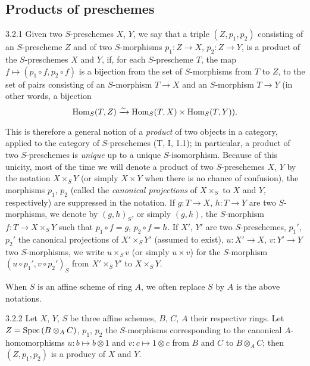 \subsection{Products of preschemes}
\label{1-schemes-3.2}

\begin{envs}[Definition]{3.2.1}
\label{defn-1.3.2.1}
Given two $S$-preschemes $X$, $Y$, we say that a triple $(Z,p_1,p_2)$ consisting of an
$S$-prescheme $Z$ and of two $S$-morphisms $p_1:Z\to X$, $p_2:Z\to Y$, is a product of the
$S$-preschemes $X$ and $Y$, if, for each $S$-prescheme $T$, the map
$f\mapsto(p_1\circ f,p_2\circ f)$ is a bijection from the set of $S$-morphisms from $T$ to
$Z$, to the set of pairs consisting of an $S$-morphism $T\to X$ and an $S$-morphism $T\to Y$
(in other words, a bijection
\[
  {\mathop{\mathrm{Hom}}\nolimits}_S(T,Z)\xrightarrow{\sim}{\mathop{\mathrm{Hom}}\nolimits}_S(T,X)\times{\mathop{\mathrm{Hom}}\nolimits}_S(T,Y)).
\]
\end{envs}

This is therefore a general notion of a \emph{product} of two objects in a category, applied
to the category of $S$-preschemes (T, I, 1.1); in particular, a product of two $S$-preschemes
is \emph{unique} up to a unique $S$-isomorphism. Because of this unicity, most of the time we
will denote a product of two $S$-preschemes $X$, $Y$ by the notation $X\times_S Y$ (or simply
$X\times Y$ when there is no chance of confusion), the morphisms $p_1$, $p_2$ (called the
\emph{canonical projections} of $X\times_S$ to $X$ and $Y$, respectively) are suppressed in
the notation. If $g:T\to X$, $h:T\to Y$ are two $S$-morphisms, we denote by $(g,h)_S$, or
simply $(g,h)$, the $S$-morphism $f:T\to X\times_S Y$ such that $p_1\circ f=g$,
$p_2\circ f=h$. If $X'$, $Y'$ are two $S$-preschemes, $p_1'$, $p_2'$ the canonical
projections of $X'\times_S Y'$ (assumed to exist), $u:X'\to X$, $v:Y'\to Y$ two
$S$-morphisms, we write $u\times_S v$ (or simply $u\times v$) for the $S$-morphism
$(u\circ p_1',v\circ p_2')_S$ from $X'\times_S Y'$ to $X\times_S Y$.

When $S$ is an affine scheme of ring $A$, we often replace $S$
by $A$ is the above notations.

\begin{envs}[Proposition]{3.2.2}
\label{prop-1.3.2.2}
Let $X$, $Y$, $S$ be three affine schemes, $B$, $C$, $A$ their respective rings. Let
$Z={\mathop{\mathrm{Spec}}\nolimits}\,(B\otimes_A C)$, $p_1$, $p_2$ the $S$-morphisms corresponding  to
the canonical $A$-homomorphisms $u:b\mapsto b\otimes 1$ and $v:c\mapsto 1\otimes c$ from $B$
and $C$ to $B\otimes_A C$; then $(Z,p_1,p_2)$ is a producy of $X$ and $Y$.
\end{envs}


